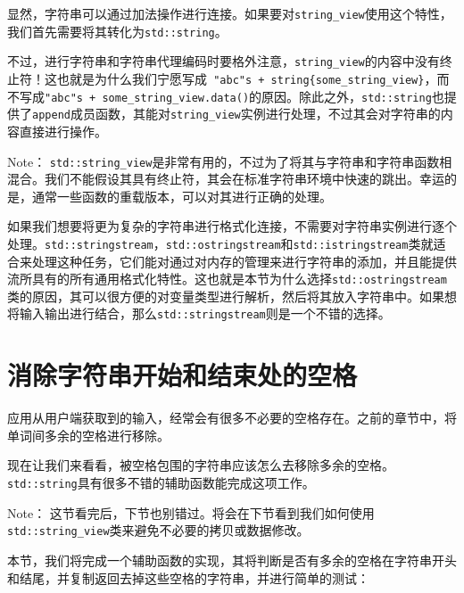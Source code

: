 
显然，字符串可以通过加法操作进行连接。如果要对\texttt{string\_view}使用这个特性，我们首先需要将其转化为\texttt{std::string}。

不过，进行字符串和字符串代理编码时要格外注意，\texttt{string\_view}的内容中没有终止符！这也就是为什么我们宁愿写成\texttt{ "abc"s + string\{some\_string\_view\}}，而不写成\texttt{"abc"s + some\_string\_view.data()}的原因。除此之外，\texttt{std::string}也提供了\texttt{append}成员函数，其能对\texttt{string\_view}实例进行处理，不过其会对字符串的内容直接进行操作。

\begin{myInfoBox}
Note： \texttt{std::string\_view}是非常有用的，不过为了将其与字符串和字符串函数相混合。我们不能假设其具有终止符，其会在标准字符串环境中快速的跳出。幸运的是，通常一些函数的重载版本，可以对其进行正确的处理。
\end{myInfoBox}

如果我们想要将更为复杂的字符串进行格式化连接，不需要对字符串实例进行逐个处理。\texttt{std::stringstream}，\texttt{std::ostringstream}和\texttt{std::istringstream}类就适合来处理这种任务，它们能对通过对内存的管理来进行字符串的添加，并且能提供流所具有的所有通用格式化特性。这也就是本节为什么选择\texttt{std::ostringstream}类的原因，其可以很方便的对变量类型进行解析，然后将其放入字符串中。如果想将输入输出进行结合，那么\texttt{std::stringstream}则是一个不错的选择。


\section{消除字符串开始和结束处的空格}

应用从用户端获取到的输入，经常会有很多不必要的空格存在。之前的章节中，将单词间多余的空格进行移除。

现在让我们来看看，被空格包围的字符串应该怎么去移除多余的空格。\texttt{std::string}具有很多不错的辅助函数能完成这项工作。

\begin{myInfoBox}
Note： 这节看完后，下节也别错过。将会在下节看到我们如何使用\texttt{std::string\_view}类来避免不必要的拷贝或数据修改。
\end{myInfoBox}


本节，我们将完成一个辅助函数的实现，其将判断是否有多余的空格在字符串开头和结尾，并复制返回去掉这些空格的字符串，并进行简单的测试：


